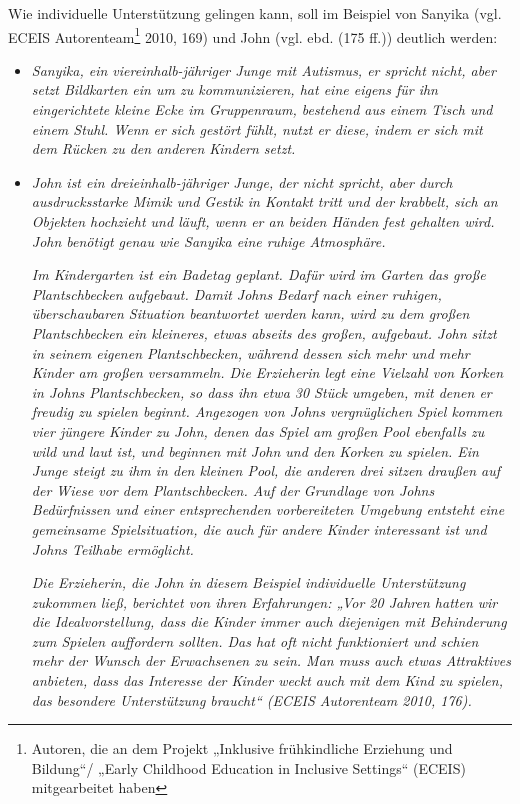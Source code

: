 Wie individuelle Unterstützung gelingen kann, soll im Beispiel von Sanyika (vgl. ECEIS Autorenteam\footnote{Autoren, die an dem Projekt „Inklusive frühkindliche Erziehung und Bildung“/ „Early Childhood Education in Inclusive Settings“ (ECEIS) mitgearbeitet haben} 2010, 169) und John (vgl. ebd. (175 ff.)) deutlich werden:

\begin{itemize}
\item \emph{Sanyika, ein viereinhalb-jähriger Junge mit Autismus, er spricht nicht, aber setzt Bildkarten ein um zu kommunizieren, hat eine eigens für ihn eingerichtete kleine Ecke im Gruppenraum, bestehend aus einem Tisch und einem Stuhl. Wenn er sich gestört fühlt, nutzt er diese, indem er sich mit dem Rücken zu den anderen Kindern setzt.} 

\item \emph{John ist ein dreieinhalb-jähriger Junge, der nicht spricht, aber durch ausdrucksstarke Mimik und Gestik in Kontakt tritt und der krabbelt, sich an Objekten hochzieht und läuft, wenn er an beiden Händen fest gehalten wird. John benötigt genau wie Sanyika eine ruhige Atmosphäre.} 

\emph{Im Kindergarten ist ein Badetag geplant. Dafür wird im Garten das große Plantschbecken aufgebaut. Damit Johns Bedarf nach einer ruhigen, überschaubaren Situation beantwortet werden kann, wird zu dem großen Plantschbecken ein kleineres, etwas abseits des großen, aufgebaut. John sitzt in seinem eigenen Plantschbecken, während dessen sich mehr und mehr Kinder am großen versammeln. Die Erzieherin legt eine Vielzahl von Korken in Johns Plantschbecken, so dass ihn etwa 30 Stück umgeben, mit denen er freudig zu spielen beginnt. Angezogen von Johns vergnüglichen Spiel kommen vier jüngere Kinder zu John, denen das Spiel am großen Pool ebenfalls zu wild und laut ist, und beginnen mit John und den Korken zu spielen. Ein Junge steigt zu ihm in den kleinen Pool, die anderen drei sitzen draußen auf der Wiese vor dem Plantschbecken. 
Auf der Grundlage von Johns Bedürfnissen und einer entsprechenden vorbereiteten Umgebung entsteht eine gemeinsame Spielsituation, die auch für andere Kinder interessant ist und Johns Teilhabe ermöglicht.}

\emph{Die Erzieherin, die John in diesem Beispiel individuelle Unterstützung zukommen ließ, berichtet von ihren Erfahrungen: „Vor 20 Jahren hatten wir die Idealvorstellung, dass die Kinder immer auch diejenigen mit Behinderung zum Spielen auffordern sollten. Das hat oft nicht funktioniert und schien mehr der Wunsch der Erwachsenen zu sein. Man muss auch etwas Attraktives anbieten, dass das Interesse der Kinder weckt auch mit dem Kind zu spielen, das besondere Unterstützung braucht“ (ECEIS Autorenteam 2010, 176).}
\end{itemize}

